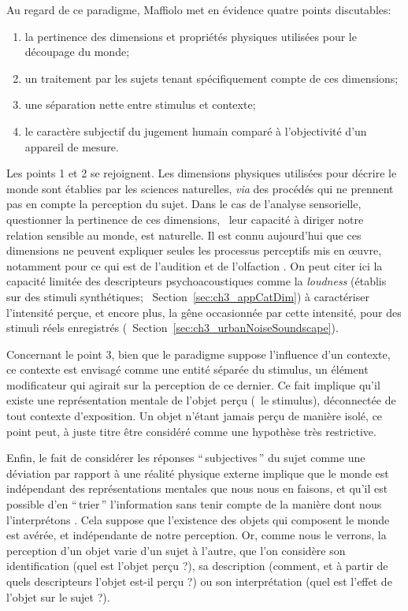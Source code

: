 Au regard de ce paradigme, Maffiolo met en évidence quatre points discutables:

\begin{enumerate}
\item la pertinence des dimensions et propriétés physiques utilisées pour le découpage du monde; 
\item un traitement par les sujets tenant spécifiquement compte de ces dimensions;
\item une séparation nette entre stimulus et contexte;
\item le caractère subjectif du jugement humain comparé à l'objectivité d'un appareil de mesure.
\end{enumerate}


Les points 1 et 2 se rejoignent. Les dimensions physiques utilisées pour décrire le monde sont établies par les sciences naturelles, \emph{via} des procédés qui ne prennent pas en compte la perception du sujet. Dans le cas de l'analyse sensorielle, questionner la pertinence de ces dimensions,  \ie~leur capacité à diriger notre relation sensible au monde, est naturelle. Il est connu aujourd'hui que ces dimensions ne peuvent expliquer seules les processus perceptifs mis en œuvre, notamment pour ce qui est de l'audition et de l'olfaction \citep{dubois2000categories}. On peut citer ici la capacité limitée des descripteurs psychoacoustiques comme la \emph{loudness} (établis sur des stimuli synthétiques; \cf~Section~\ref{sec:ch3_appCatDim}) à caractériser l'intensité perçue, et encore plus, la gêne occasionnée par cette intensité, pour des stimuli réels enregistrés (\cf~Section~\ref{sec:ch3_urbanNoiseSoundscape}). 

Concernant le point 3, bien que le paradigme suppose l'influence d'un contexte, ce contexte est envisagé comme une entité séparée du stimulus, un élément modificateur qui agirait sur la perception de ce dernier. Ce fait implique qu'il existe une représentation mentale de l'objet perçu (\ie~le stimulus), déconnectée de tout contexte d'exposition. Un objet n'étant jamais perçu de manière isolé, ce point peut, à juste titre  être considéré comme une hypothèse très restrictive.

Enfin, le fait de considérer les réponses ``\,subjectives\,'' du sujet comme une déviation par rapport à une réalité physique externe implique que le monde  est indépendant des représentations mentales que nous nous en faisons, et qu'il est possible d'en ``\,trier\,'' l'information sans tenir compte de la manière dont nous l'interprétons \citep{dubois2000categories}. Cela suppose que l'existence des objets qui composent le monde est avérée, et indépendante de notre perception. Or, comme nous le verrons, la perception d'un objet varie d'un sujet à l'autre, que l'on considère son identification (quel est l'objet perçu ?), sa description (comment, et à partir de quels descripteurs l'objet est-il perçu ?) ou son interprétation (quel est l'effet de l'objet sur le sujet ?). 

